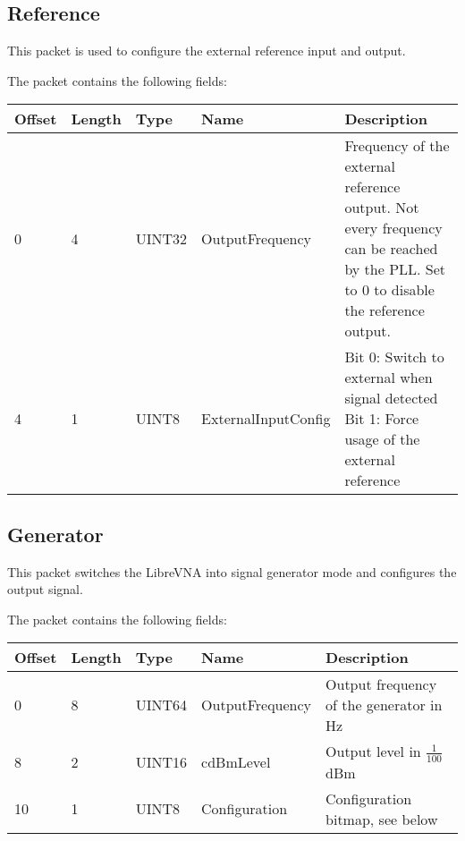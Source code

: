 \documentclass[a4paper,11pt]{article}
\begin{document}
\subsection{Reference}
This packet is used to configure the external reference input and output.

The packet contains the following fields:
\begin{ThreePartTable}
\setlength\tabcolsep{3pt}

\begin{longtable}{p{} |  p{}  |  p{}| p{} | p{}}
\toprule
\textbf{Offset} &\textbf{Length} &\textbf{Type} & \textbf{Name} &\textbf{Description} \\ 
\hline
\endhead
\midrule[\heavyrulewidth]
\endfoot  
\midrule[\heavyrulewidth]
\endlastfoot

0 & 4 & UINT32 & OutputFrequency & Frequency of the external reference output. Not every frequency can be reached by the PLL. Set to 0 to disable the reference output.\\
4 & 1 & UINT8 & ExternalInputConfig & \makecell[l]{Bit 0: Switch to external when signal detected\\Bit 1: Force usage of the external reference} \\
\end{longtable}   
\end{ThreePartTable}

\subsection{Generator}
This packet switches the LibreVNA into signal generator mode and configures the output signal.

The packet contains the following fields:
\begin{ThreePartTable}
\setlength\tabcolsep{3pt}

\begin{longtable}{p{} |  p{}  |  p{}| p{} | p{}}
\toprule
\textbf{Offset} &\textbf{Length} &\textbf{Type} & \textbf{Name} &\textbf{Description} \\ 
\hline
\endhead
\midrule[\heavyrulewidth]
\endfoot  
\midrule[\heavyrulewidth]
\endlastfoot

0 & 8 & UINT64 & OutputFrequency & Output frequency of the generator in Hz\\
8 & 2 & UINT16 & cdBmLevel & Output level in $\frac{1}{100}$dBm \\
10 & 1 & UINT8 & Configuration & Configuration bitmap, see below \\
\end{longtable}   
\end{ThreePartTable}
\end{document}
